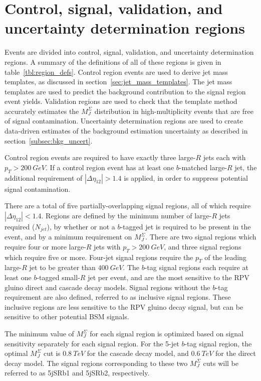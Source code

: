 \section{Control, signal, validation, and uncertainty determination regions} \label{sec:region_defs}
Events are divided into control, signal, validation, and uncertainty determination regions.
A summary of the definitions of all of these regions is given in table~\ref{tbl:region_defs}.
Control region events are used to derive jet mass templates, as discussed in section~\ref{sec:jet_mass_templates}.
The jet mass templates are used to predict the background contribution to the signal region event yields.
Validation regions are used to check that the template method accurately estimates the $M_J^{\Sigma}$ distribution in high-multiplicity events that are free of signal contamination.
Uncertainty determination regions are used to create data-driven estimates of the background estimation uncertainty as described in section~\ref{subsec:bkg_uncert}.

Control region events are required to have exactly three large-$R$ jets each with $p_{T}>200~GeV$.
If a control region event has at least one $b$-matched large-$R$ jet, the additional requirement of $|\Delta\eta_{12}|>1.4$ is applied, in order to suppress potential signal contamination.

There are a total of five partially-overlapping signal regions, all of which require $|\Delta\eta_{12}|<1.4$.
Regions are defined by the minimum number of large-$R$ jets required ($N_{jet}$), by whether or not a $b$-tagged jet is required to be present in the event, and by a minimum requirement on $M_{J}^{\Sigma}$.
There are two signal regions which require four or more large-$R$ jets with $p_{T}>200~GeV$, and three signal regions which require five or more.
Four-jet signal regions require the $p_T$ of the leading large-$R$ jet to be greater than $400~GeV$.
The $b$-tag signal regions each require at least one $b$-tagged small-$R$ jet per event, and are the most sensitive to the RPV gluino direct and cascade decay models.
Signal regions without the $b$-tag requirement are also defined, referred to as inclusive signal regions.
These inclusive regions are less sensitive to the RPV gluino decay signal, but can be sensitive to other potential BSM signals.

The minimum value of $M_{J}^{\Sigma}$ for each signal region is optimized based on signal sensitivity separately for each signal region.
For the 5-jet $b$-tag signal region, the optimal $M_{J}^{\Sigma}$ cut is $0.8~TeV$ for the cascade decay model, and $0.6~TeV$ for the direct decay model.
The signal regions corresponding to these two $M_{J}^{\Sigma}$ cuts will be referred to as 5jSRb1 and 5jSRb2, respectively.

